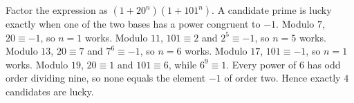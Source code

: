 Factor the expression as $(1+20^n)(1+101^n)$. A candidate prime is lucky exactly when one of the two bases has a power congruent to $-1$. Modulo $7$, $20\equiv-1$, so $n=1$ works. Modulo $11$, $101\equiv2$ and $2^5\equiv-1$, so $n=5$ works. Modulo $13$, $20\equiv7$ and $7^6\equiv-1$, so $n=6$ works. Modulo $17$, $101\equiv-1$, so $n=1$ works. Modulo $19$, $20\equiv1$ and $101\equiv6$, while $6^9\equiv1$. Every power of $6$ has odd order dividing nine, so none equals the element $-1$ of order two. Hence exactly $\boxed4$ candidates are lucky.
